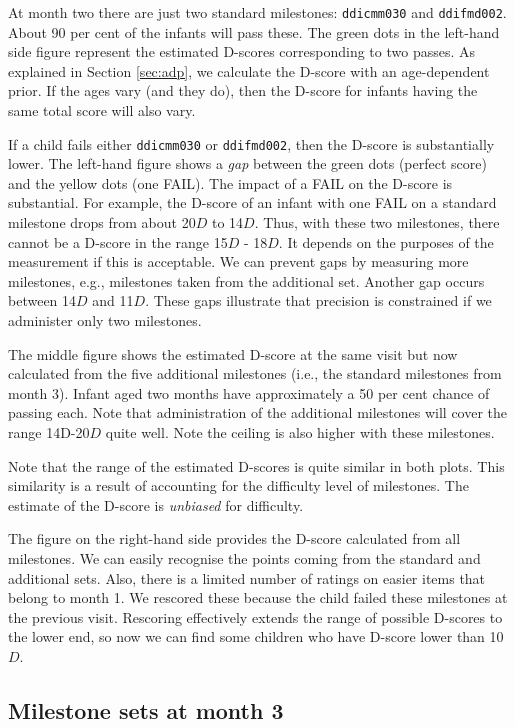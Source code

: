 \documentclass[
]{book}
\begin{document}
At month two there are just two standard milestones: \texttt{ddicmm030} and \texttt{ddifmd002}. About 90 per cent of the infants will pass these. The green dots in the left-hand side figure represent the estimated D-scores corresponding to two passes. As explained in Section \ref{sec:adp}, we calculate the D-score with an age-dependent prior. If the ages vary (and they do), then the D-score for infants having the same total score will also vary.

If a child fails either \texttt{ddicmm030} or \texttt{ddifmd002}, then the D-score is substantially lower. The left-hand figure shows a \emph{gap} between the green dots (perfect score) and the yellow dots (one FAIL). The impact of a FAIL on the D-score is substantial. For example, the D-score of an infant with one FAIL on a standard milestone drops from about 20\(D\) to 14\(D\). Thus, with these two milestones, there cannot be a D-score in the range 15\(D\) - 18\(D\). It depends on the purposes of the measurement if this is acceptable. We can prevent gaps by measuring more milestones, e.g., milestones taken from the additional set. Another gap occurs between 14\(D\) and 11\(D\). These gaps illustrate that precision is constrained if we administer only two milestones.

The middle figure shows the estimated D-score at the same visit but now calculated from the five additional milestones (i.e., the standard milestones from month 3). Infant aged two months have approximately a 50 per cent chance of passing each. Note that administration of the additional milestones will cover the range 14D-20\(D\) quite well. Note the ceiling is also higher with these milestones.

Note that the range of the estimated D-scores is quite similar in both plots. This similarity is a result of accounting for the difficulty level of milestones. The estimate of the D-score is \emph{unbiased} for difficulty.

The figure on the right-hand side provides the D-score calculated from all milestones. We can easily recognise the points coming from the standard and additional sets. Also, there is a limited number of ratings on easier items that belong to month 1. We rescored these because the child failed these milestones at the previous visit. Rescoring effectively extends the range of possible D-scores to the lower end, so now we can find some children who have D-score lower than 10\(D\).

\hypertarget{milestone-sets-at-month-3}{%
\subsection{Milestone sets at month 3}\label{milestone-sets-at-month-3}}
\end{document}
